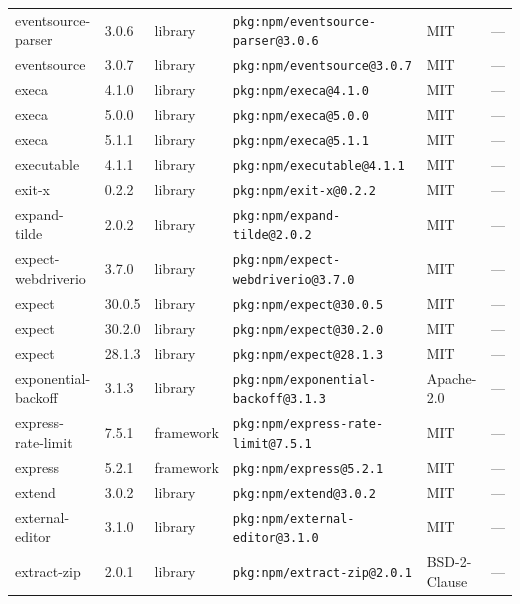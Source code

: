 \documentclass[11pt,a4paper]{article}
\begin{document}
\begin{longtable}{|p{4cm}|p{2cm}|p{1.6cm}|p{5cm}|p{1.5cm}|p{3.5cm}|}
\raggedright eventsource-parser & 3.0.6 & library & \small\texttt{pkg:npm/eventsource-parser@3.0.6} & MIT & \small — \\
\raggedright eventsource & 3.0.7 & library & \small\texttt{pkg:npm/eventsource@3.0.7} & MIT & \small — \\
\raggedright execa & 4.1.0 & library & \small\texttt{pkg:npm/execa@4.1.0} & MIT & \small — \\
\raggedright execa & 5.0.0 & library & \small\texttt{pkg:npm/execa@5.0.0} & MIT & \small — \\
\raggedright execa & 5.1.1 & library & \small\texttt{pkg:npm/execa@5.1.1} & MIT & \small — \\
\raggedright executable & 4.1.1 & library & \small\texttt{pkg:npm/executable@4.1.1} & MIT & \small — \\
\raggedright exit-x & 0.2.2 & library & \small\texttt{pkg:npm/exit-x@0.2.2} & MIT & \small — \\
\raggedright expand-tilde & 2.0.2 & library & \small\texttt{pkg:npm/expand-tilde@2.0.2} & MIT & \small — \\
\raggedright expect-webdriverio & 3.7.0 & library & \small\texttt{pkg:npm/expect-webdriverio@3.7.0} & MIT & \small — \\
\raggedright expect & 30.0.5 & library & \small\texttt{pkg:npm/expect@30.0.5} & MIT & \small — \\
\raggedright expect & 30.2.0 & library & \small\texttt{pkg:npm/expect@30.2.0} & MIT & \small — \\
\raggedright expect & 28.1.3 & library & \small\texttt{pkg:npm/expect@28.1.3} & MIT & \small — \\
\raggedright exponential-backoff & 3.1.3 & library & \small\texttt{pkg:npm/exponential-backoff@3.1.3} & Apache-2.0 & \small — \\
\raggedright express-rate-limit & 7.5.1 & framework & \small\texttt{pkg:npm/express-rate-limit@7.5.1} & MIT & \small — \\
\raggedright express & 5.2.1 & framework & \small\texttt{pkg:npm/express@5.2.1} & MIT & \small — \\
\raggedright extend & 3.0.2 & library & \small\texttt{pkg:npm/extend@3.0.2} & MIT & \small — \\
\raggedright external-editor & 3.1.0 & library & \small\texttt{pkg:npm/external-editor@3.1.0} & MIT & \small — \\
\raggedright extract-zip & 2.0.1 & library & \small\texttt{pkg:npm/extract-zip@2.0.1} & BSD-2-Clause & \small — \\

\end{longtable}
\end{document}
